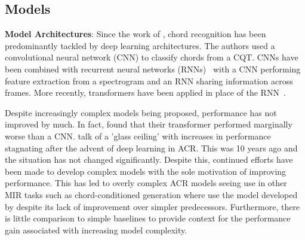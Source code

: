 

\subsection{Models}

\textbf{Model Architectures}: Since the work of \citet{RethinkingChordRecognition}, chord recognition has been predominantly tackled by deep learning architectures. The authors used a convolutional neural network (CNN) to classify chords from a CQT. CNNs have been combined with recurrent neural networks (RNNs)~\citep{ACRCNNRNN1,ACRLargeVocab1,StructuredTraining} with a CNN performing feature extraction from a spectrogram and an RNN sharing information across frames. More recently, transformers have been applied in place of the RNN~\citep{MelodyTranscriptionViaGenerativePreTraining, HarmonyTransformer, AttendToChords,CurriculumLearning,BTC}.

Despite increasingly complex models being proposed, performance has not improved by much. In fact, \citet{BTC} found that their transformer performed marginally worse than a CNN. \citet{FourTimelyInsights} talk of a 'glass ceiling' with increases in performance stagnating after the advent of deep learning in ACR. This was 10 years ago and the situation has not changed significantly. Despite this, continued efforts have been made to develop complex models with the sole motivation of improving performance. This has led to overly complex ACR models seeing use in other MIR tasks such as chord-conditioned generation where \citet{MusiConGen} use the model developed by \citet{BTC} despite its lack of improvement over simpler predecessors. Furthermore, there is little comparison to simple baselines to provide context for the performance gain associated with increasing model complexity.

